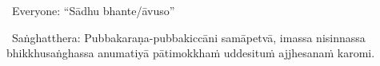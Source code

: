 \begin{center}
	\anglebracketleft\ \hspace{-0.5mm}Everyone: ``Sādhu bhante/āvuso'' \hspace{-0.5mm}\anglebracketright\
\end{center}

\begin{center}
	\anglebracketleft\ \hspace{-0.5mm}Saṅghatthera: Pubbakaraṇa-pubbakiccāni samāpetvā, imassa nisinnassa bhikkhusaṅghassa anumatiyā pātimokkhaṁ uddesituṁ ajjhesanaṁ karomi. \hspace{-0.5mm}\anglebracketright\
\end{center}

\clearpage

